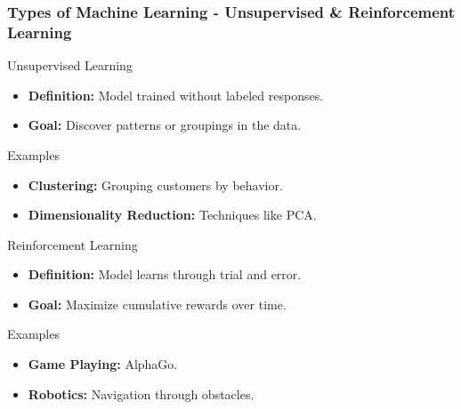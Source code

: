 \documentclass[aspectratio=169]{beamer}
\begin{document}
\begin{frame}[fragile]
    \frametitle{Types of Machine Learning - Unsupervised & Reinforcement Learning}
    \begin{block}{Unsupervised Learning}
        \begin{itemize}
            \item \textbf{Definition:} Model trained without labeled responses.
            \item \textbf{Goal:} Discover patterns or groupings in the data.
        \end{itemize}
    \end{block}
    
    \begin{exampleblock}{Examples}
        \begin{itemize}
            \item \textbf{Clustering:} Grouping customers by behavior.
            \item \textbf{Dimensionality Reduction:} Techniques like PCA.
        \end{itemize}
    \end{exampleblock}

    \begin{block}{Reinforcement Learning}
        \begin{itemize}
            \item \textbf{Definition:} Model learns through trial and error.
            \item \textbf{Goal:} Maximize cumulative rewards over time.
        \end{itemize}
    \end{block}
    
    \begin{exampleblock}{Examples}
        \begin{itemize}
            \item \textbf{Game Playing:} AlphaGo.
            \item \textbf{Robotics:} Navigation through obstacles.
        \end{itemize}
    \end{exampleblock}
\end{frame}
\end{document}
